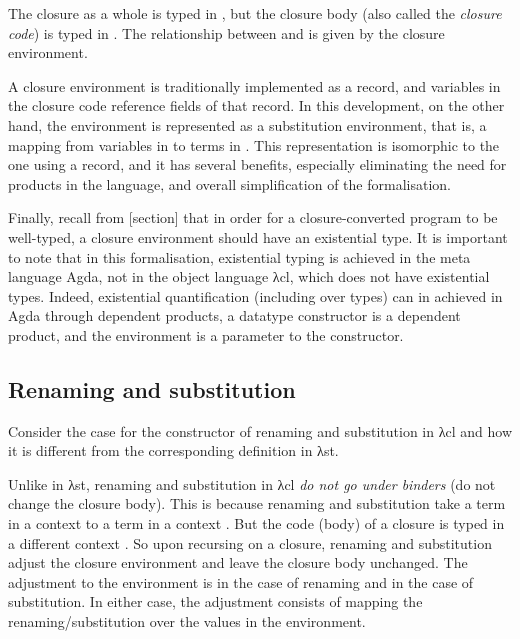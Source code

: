\documentclass[bsc,frontabs,oneside,singlespacing,parskip,deptreport]{infthesis}
\theoremstyle{definition}
\theoremstyle{lemma}
\begin{document}
The closure as a whole is typed in , but the closure body (also
called the \textit{closure code}) is typed in . The
relationship between  and  is given by the closure
environment.

A closure environment is traditionally implemented as a record, and
variables in the closure code reference fields of that record. In this
development, on the other hand, the environment is represented as a
substitution environment, that is, a mapping from variables in 
to terms in . This representation is isomorphic to the one using
a record, and it has several benefits, especially eliminating the need
for products in the language, and overall simplification of the
formalisation.

Finally, recall from [section] that in order for a closure-converted
program to be well-typed, a closure environment should have an
existential type. It is important to note that in this formalisation,
existential typing is achieved in the meta language Agda, not in the
object language λcl, which does not have existential types. Indeed,
existential quantification (including over types) can in achieved in
Agda through dependent products, a datatype constructor is a dependent
product, and the environment is a parameter to the  constructor.

\subsection{Renaming and substitution}
\label{sec:renam-subst}

Consider the case for the constructor  of renaming and
substitution in λcl and how it is different from the corresponding
definition in λst.


Unlike in λst, renaming and substitution in λcl \textit{do not go
  under binders} (do not change the closure body). This is because
renaming and substitution take a term in a context  to a term in
a context . But the code (body) of a closure is typed in a
different context . So upon recursing on a closure, renaming and
substitution adjust the closure environment and leave the closure body
unchanged. The adjustment to the environment is 
in the case of renaming and  in the case of
substitution. In either case, the adjustment consists of mapping the
renaming/substitution over the values in the environment.
\end{document}
